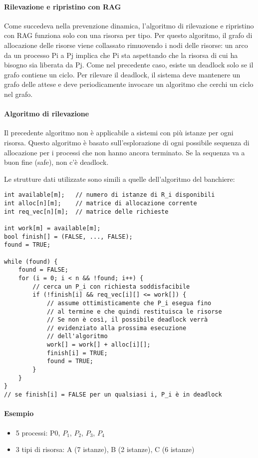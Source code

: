 \documentclass[a4paper]{article}
\begin{document}
\paragraph{Rilevazione e ripristino con RAG}
Come succedeva nella prevenzione dinamica, l'algoritmo di rilevazione e ripristino con RAG funziona solo con una risorsa per tipo. Per questo algoritmo, il grafo di allocazione delle risorse viene collassato rimuovendo i nodi delle risorse: un arco da un processo Pi a Pj implica che Pi sta aspettando che la risorsa di cui ha bisogno sia liberata da Pj. Come nel precedente caso, esiste un deadlock solo se il grafo contiene un ciclo. Per rilevare il deadlock, il sistema deve mantenere un grafo delle attese e deve periodicamente invocare un algoritmo che cerchi un ciclo nel grafo.

\paragraph{Algoritmo di rilevazione} Il precedente algoritmo non è applicabile a sistemi con più istanze per ogni risorsa. Questo algoritmo è basato sull'esplorazione di ogni possibile sequenza di allocazione per i processi che non hanno ancora terminato. Se la sequenza va a buon fine (safe), non c'è deadlock.

Le strutture dati utilizzate sono simili a quelle dell'algoritmo del banchiere:
\begin{Verbatim}[tabsize=3]
int available[m];   // numero di istanze di R_i disponibili
int alloc[n][m];    // matrice di allocazione corrente
int req_vec[n][m];  // matrice delle richieste

int work[m] = available[m];
bool finish[] = (FALSE, ..., FALSE);
found = TRUE;

while (found) {
    found = FALSE;
    for (i = 0; i < n && !found; i++) {
        // cerca un P_i con richiesta soddisfacibile
        if (!finish[i] && req_vec[i][] <= work[]) {
            // assume ottimisticamente che P_i esegua fino
            // al termine e che quindi restituisca le risorse
            // Se non è così, il possibile deadlock verrà
            // evidenziato alla prossima esecuzione
            // dell'algoritmo
            work[] = work[] + alloc[i][];
            finish[i] = TRUE;
            found = TRUE;
        }
    }
} 
// se finish[i] = FALSE per un qualsiasi i, P_i è in deadlock
\end{Verbatim}

\paragraph{Esempio}
\begin{itemize}
    \item 5 processi: P0, $P_1$, $P_2$, $P_3$, $P_4$
    \item 3 tipi di risorsa: A (7 istanze), B (2 istanze), C (6 istanze)
\end{itemize}
\end{document}
